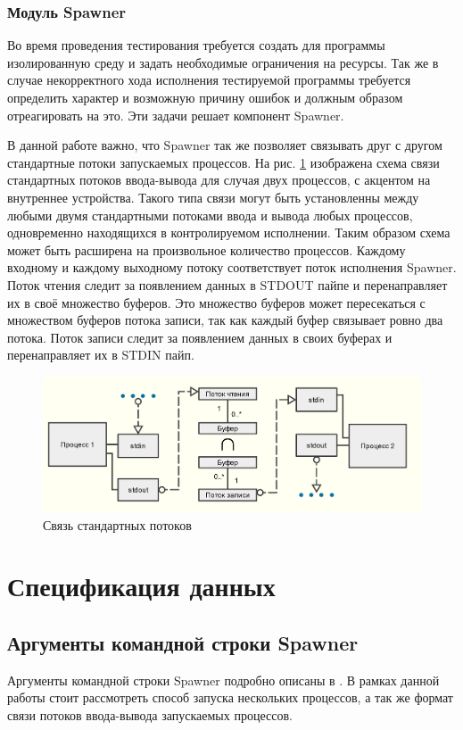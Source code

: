 \documentclass{imcs}
\begin{document}
\FloatBarrier
\subsubsection{Модуль Spawner}

Во время проведения тестирования требуется создать для программы изолированную среду и задать необходимые ограничения на ресурсы. Так же в случае некорректного хода исполнения тестируемой программы требуется определить характер и возможную причину ошибок и должным образом отреагировать на это. Эти задачи решает компонент Spawner.

В данной работе важно, что Spawner так же позволяет связывать друг с другом стандартные потоки запускаемых процессов. На рис. \ref{data_flow} изображена схема связи стандартных потоков ввода-вывода для случая двух процессов, с акцентом на внутреннее устройства. Такого типа связи могут быть установленны между любыми двумя стандартными потоками ввода и вывода любых процессов, одновременно находящихся в контролируемом исполнении. Таким образом схема может быть расширена на произвольное количество процессов. Каждому входному и каждому выходному потоку соответствует поток исполнения Spawner. Поток чтения следит за появлением данных в STDOUT пайпе и перенаправляет их в своё множество буферов. Это множество буферов может пересекаться с множеством буферов потока записи, так как каждый буфер связывает ровно два потока. Поток записи следит за появлением данных в своих буферах и перенаправляет их в STDIN пайп.

\begin{figure}[htb]
\centering
\includegraphics[width=\textwidth,keepaspectratio]{./img/data_flow.png}
\caption{Связь стандартных потоков}
\label{data_flow}
\end{figure}

\FloatBarrier

\section{Спецификация данных}
\subsection{Аргументы командной строки Spawner}
Аргументы командной строки Spawner подробно описаны в \cite{khrapchenkov}. В рамках данной работы стоит рассмотреть способ запуска нескольких процессов, а так же формат связи потоков ввода-вывода запускаемых процессов.
\end{document}
